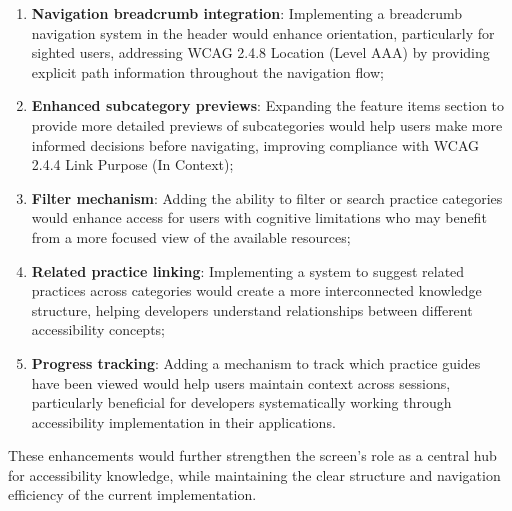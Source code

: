 \begin{enumerate}
    \item \textbf{Navigation breadcrumb integration}: Implementing a breadcrumb navigation system in the header would enhance orientation, particularly for sighted users, addressing WCAG 2.4.8 Location (Level AAA) by providing explicit path information throughout the navigation flow;
    
    \item \textbf{Enhanced subcategory previews}: Expanding the feature items section to provide more detailed previews of subcategories would help users make more informed decisions before navigating, improving compliance with WCAG 2.4.4 Link Purpose (In Context);
    
    \item \textbf{Filter mechanism}: Adding the ability to filter or search practice categories would enhance access for users with cognitive limitations who may benefit from a more focused view of the available resources;
    
    \item \textbf{Related practice linking}: Implementing a system to suggest related practices across categories would create a more interconnected knowledge structure, helping developers understand relationships between different accessibility concepts;
    
    \item \textbf{Progress tracking}: Adding a mechanism to track which practice guides have been viewed would help users maintain context across sessions, particularly beneficial for developers systematically working through accessibility implementation in their applications.
\end{enumerate}

These enhancements would further strengthen the screen's role as a central hub for accessibility knowledge, while maintaining the clear structure and navigation efficiency of the current implementation.


\newpage

